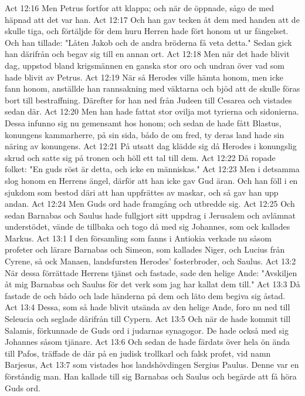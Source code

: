 Act 12:16  Men Petrus fortfor att klappa; och när de öppnade, sågo de med häpnad att det var han.
Act 12:17  Och han gav tecken åt dem med handen att de skulle tiga, och förtäljde för dem huru Herren hade fört honom ut ur fängelset. Och han tillade: "Låten Jakob och de andra bröderna få veta detta." Sedan gick han därifrån och begav sig till en annan ort.
Act 12:18  Men när det hade blivit dag, uppstod bland krigsmännen en ganska stor oro och undran över vad som hade blivit av Petrus.
Act 12:19  När så Herodes ville hämta honom, men icke fann honom, anställde han rannsakning med väktarna och bjöd att de skulle föras bort till bestraffning. Därefter for han ned från Judeen till Cesarea och vistades sedan där.
Act 12:20  Men han hade fattat stor ovilja mot tyrierna och sidonierna. Dessa infunno sig nu gemensamt hos honom; och sedan de hade fått Blastus, konungens kammarherre, på sin sida, bådo de om fred, ty deras land hade sin näring av konungens.
Act 12:21  På utsatt dag klädde sig då Herodes i konungslig skrud och satte sig på tronen och höll ett tal till dem.
Act 12:22  Då ropade folket: "En guds röst är detta, och icke en människas."
Act 12:23  Men i detsamma slog honom en Herrens ängel, därför att han icke gav Gud äran. Och han föll i en sjukdom som bestod däri att han uppfrättes av maskar, och så gav han upp andan.
Act 12:24  Men Guds ord hade framgång och utbredde sig.
Act 12:25  Och sedan Barnabas och Saulus hade fullgjort sitt uppdrag i Jerusalem och avlämnat understödet, vände de tillbaka och togo då med sig Johannes, som ock kallades Markus.
Act 13:1  I den församling som fanns i Antiokia verkade nu såsom profeter och lärare Barnabas och Simeon, som kallades Niger, och Lucius från Cyrene, så ock Manaen, landsfursten Herodes' fosterbroder, och Saulus.
Act 13:2  När dessa förrättade Herrens tjänst och fastade, sade den helige Ande: "Avskiljen åt mig Barnabas och Saulus för det verk som jag har kallat dem till."
Act 13:3  Då fastade de och bådo och lade händerna på dem och läto dem begiva sig åstad.
Act 13:4  Dessa, som så hade blivit utsända av den helige Ande, foro nu ned till Seleucia och seglade därifrån till Cypern.
Act 13:5  Och när de hade kommit till Salamis, förkunnade de Guds ord i judarnas synagogor. De hade också med sig Johannes såsom tjänare.
Act 13:6  Och sedan de hade färdats över hela ön ända till Pafos, träffade de där på en judisk trollkarl och falsk profet, vid namn Barjesus,
Act 13:7  som vistades hos landshövdingen Sergius Paulus. Denne var en förståndig man. Han kallade till sig Barnabas och Saulus och begärde att få höra Guds ord.
